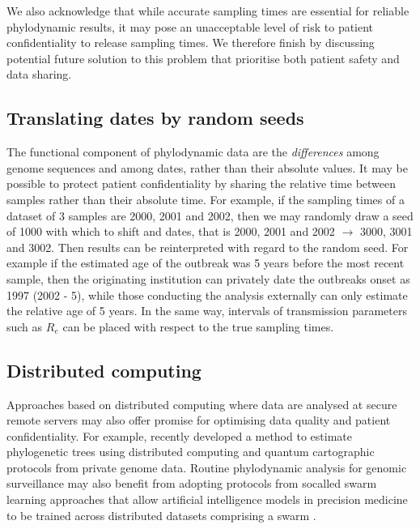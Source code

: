 \documentclass[11pt]{article}
\begin{document}
\begin{spacing}{1.5}
We also acknowledge that while accurate sampling times are essential for reliable phylodynamic results, it may pose an unacceptable level of risk to patient confidentiality to release sampling times. We therefore finish by discussing potential future solution to this problem that prioritise both patient safety and data sharing.

\subsection*{Translating dates by random seeds}
The functional component of phylodynamic data are the \emph{differences} among genome sequences and among dates, rather than their absolute values. It may be possible to protect patient confidentiality by sharing the relative time between samples rather than their absolute time. For example, if the sampling times of a dataset of 3 samples are 2000, 2001 and 2002, then we may randomly draw a seed of 1000 with which to shift and dates, that is 2000, 2001 and 2002 $\rightarrow$ 3000, 3001 and 3002. Then results can be reinterpreted with regard to the random seed. For example if the estimated age of the outbreak was 5 years before the most recent sample, then the originating institution can privately date the outbreaks onset as 1997 (2002 - 5), while those conducting the analysis externally can only estimate the relative age of 5 years. In the same way, intervals of transmission parameters such as $R_e$ can be placed with respect to the true sampling times.

\subsection*{Distributed computing}
Approaches based on distributed computing where data are analysed at secure remote servers may also offer promise for optimising data quality and patient confidentiality. For example, \citet{santos_private_2022} recently developed a method to estimate phylogenetic trees using distributed computing and quantum cartographic protocols from private genome data. Routine phylodynamic analysis for genomic surveillance may also benefit from adopting protocols from socalled swarm learning approaches that allow artificial intelligence models in precision medicine to be trained across distributed datasets comprising a swarm \citep{warnat-herresthal_swarm_2021}.

\end{spacing}



\end{document}

